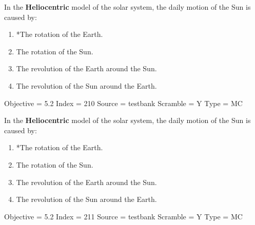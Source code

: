 \documentclass[11pt]{article}
\begin{document}
\begin{enumerate}
\begin{minipage}{\textwidth}
\begin{minipage}{\textwidth}
\item In the {\bf Heliocentric} model of the solar system, the daily motion of the Sun is caused by:
\begin{enumerate} 
\setlength{\itemsep}{1pt} 
\setlength{\parskip}{0pt} 
\setlength{\parsep}{0pt}
\setlength{\multicolsep}{1pt} 
\item *The rotation of the Earth.
\item The rotation of the Sun.
\item The revolution of the Earth around the Sun.
\item The revolution of the Sun around the Earth.
\end{enumerate} 
Objective = 5.2
Index = 210
Source = testbank
Scramble = Y
Type = MC
\end{minipage}
\end{minipage}
\vskip 0.20in

\begin{minipage}{\textwidth}
\begin{minipage}{\textwidth}
\item In the {\bf Heliocentric} model of the solar system, the daily motion of the Sun is caused by:
\begin{enumerate} 
\setlength{\itemsep}{1pt} 
\setlength{\parskip}{0pt} 
\setlength{\parsep}{0pt}
\setlength{\multicolsep}{1pt} 
\item *The rotation of the Earth.
\item The rotation of the Sun.
\item The revolution of the Earth around the Sun.
\item The revolution of the Sun around the Earth.
\end{enumerate} 
Objective = 5.2
Index = 211
Source = testbank
Scramble = Y
Type = MC
\end{minipage}
\end{minipage}
\vskip 0.20in


\end{enumerate}
\end{document}
